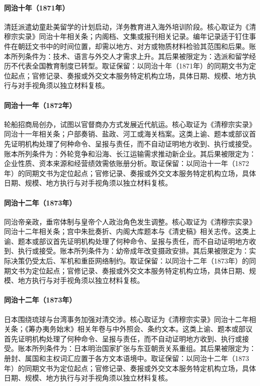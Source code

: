 \hypertarget{ledger:EQ-1871-QING-STUDENTS-ABROAD}{}\paragraph{同治十年（1871年）}清廷派遣幼童赴美留学的计划启动，洋务教育进入海外培训阶段。核心取证为《清穆宗实录》同治十年相关条；内阁档、文集或报刊相关记录。编年记录适于钉住事件在朝廷文书中的时间位置，却需以地方、对方或物质材料检验其范围和后果。账本所列条件为：技术、语言与外交人才需求上升。其后果被限定为：选派和留学经历不代表全国教育制度已转型。取证保留：以同治十年（1871年）的同期文书为定位起点；官修记录、奏报或外交文本服务特定机构立场，具体日期、规模、地方执行与对手视角须以独立材料复核。
\hypertarget{ledger:EQ-1872-CHINA-MERCHANTS-STEAM-NAVIGATION}{}\paragraph{同治十一年（1872年）}轮船招商局创办，试图以官督商办方式发展近代航运。核心取证为《清穆宗实录》同治十一年相关条；户部奏销、盐政、河工或海关档案。这类上谕、题本或部议首先证明机构处理了何种命令、呈报与责任，而不自动证明地方收到、执行或接受。账本所列条件为：外轮竞争和沿海、长江运输需求推动新企业。其后果被限定为：企业性质、资本来源和经营绩效需依账册分析。取证保留：以同治十一年（1872年）的同期文书为定位起点；官修记录、奏报或外交文本服务特定机构立场，具体日期、规模、地方执行与对手视角须以独立材料复核。
\hypertarget{ledger:EQ-1873-TONGZHI-EMPEROR-REIGN}{}\paragraph{同治十二年（1873年）}同治帝亲政，垂帘体制与皇帝个人政治角色发生调整。核心取证为《清穆宗实录》同治十二年相关条；宫中朱批奏折、内阁大库题本与《清史稿》相关志传。这类上谕、题本或部议首先证明机构处理了何种命令、呈报与责任，而不自动证明地方收到、执行或接受。账本所列条件为：幼帝成年改变摄政安排。其后果被限定为：实际决策仍受太后、军机和重臣网络制约。取证保留：以同治十二年（1873年）的同期文书为定位起点；官修记录、奏报或外交文本服务特定机构立场，具体日期、规模、地方执行与对手视角须以独立材料复核。
\hypertarget{ledger:EQ-1873-JAPAN-RYUKYU-DISPUTE}{}\paragraph{同治十二年（1873年）}日本围绕琉球与台湾事务加强对清交涉。核心取证为《清穆宗实录》同治十二年相关条；《筹办夷务始末》相关年卷与中外照会、条约文本。这类上谕、题本或部议首先证明机构处理了何种命令、呈报与责任，而不自动证明地方收到、执行或接受。账本所列条件为：日本明治国家扩张与东亚朝贡关系重组。其后果被限定为：册封、属国和主权词汇应置于各方文本语境中。取证保留：以同治十二年（1873年）的同期文书为定位起点；官修记录、奏报或外交文本服务特定机构立场，具体日期、规模、地方执行与对手视角须以独立材料复核。
